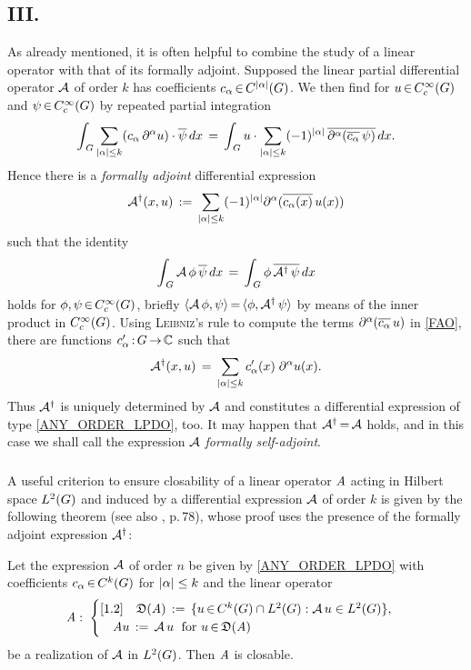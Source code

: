 \documentclass[11pt,twoside]{article}
\def\G{G}
\begin{document}
\subsection*{III. {\TITLEC}}
As already mentioned,
it is often helpful to combine the study of a linear operator
with that of its formally adjoint.
Supposed the linear partial differential operator ${\mathcal{A}}$ of order $k$
has coefficients $c_{\alpha} \xeof C^{\abs{\alpha} }(\G)$.
We then find for $u \xeof \TF$ and $\psi \xeof \TF$
by repeated partial integration
\[
\int_{\,\G} \sum_{\abs{\alpha} \leq k}
(c_{\alpha} \, \PA u) \cdot \overline{\psi} \, dx
\=
\int_{\,\G} u \cdot \sum_{\abs{\alpha} \leq k}
(-1)^{\abs{\alpha} } \, \overline{\PA(\overline{c_{\alpha}} \, \psi)} \, dx.
\]
Hence there is a \textit{formally adjoint} differential expression
\begin{equation}\label{FAO}
\A^{\dag}(x,u) \eqdef
\sum_{\abs{\alpha} \leq k} (-1)^{\abs{\alpha} }
\PA(\overline{c_{\alpha}(x)} \, u(x))
\end{equation}
such that the identity
\[
\int_{\,\G} \A \, \phi \, \overline{\psi} \, dx 
\=
\int_{\,\G} \phi \, \overline{\A^{\dag} \, \psi} \, dx 
\]
holds for $\phi,\psi \xeof \TF$,
briefly
$
\langle {\mathcal{A}}\,\phi,\psi \rangle {\,=\,} \langle \phi,{\mathcal{A}}^{\dag}\,\psi \rangle
$
by means of the inner product in $\TF$.
Using \textsc{Leibniz}'s rule to compute the terms
$\partial^{\alpha}(\overline{c_{\alpha}} \, u)$ in \eqref{FAO},
there are functions $c_{\alpha}'\: \G \xto \C$
such that
\[
\A^{\dag}(x,u) \=
\sum_{\abs{\alpha} \leq k} c_{\alpha}'(x) \; \PA u(x).
\]
Thus ${\mathcal{A}}^{\dag}$ is uniquely determined by ${\mathcal{A}}$
and constitutes a differential expression of type \eqref{ANY_ORDER_LPDO},
too.
It may happen that ${\mathcal{A}}^{\dag} {\,=\,} {\mathcal{A}}$ holds,
and in this case
we shall call the expression ${\mathcal{A}}$ \textit{formally self-adjoint}.

\subparagraph{} %
A useful criterion to ensure closability of a linear operator $\mathit{A}$
acting in Hilbert space $\Lh$
and induced by a differential expression ${\mathcal{A}}$ of order $k$
is given by the following theorem
(see also \cite{Yo}, p.\,78),
whose proof uses the presence of the formally adjoint expression ${\mathcal{A}}^{\dag}$:

\begin{theorem1}\label{L2_CLOSABILITY_THEOREM}
Let the expression ${\mathcal{A}}$ of order $n$ be given by \eqref{ANY_ORDER_LPDO}
with coefficients $c_{\alpha} \xeof C^k(\G)$ for $\abs{\alpha} \leq k$ and
the linear operator
\[
\linA: \;
\begin{cases}[1.2]
\quad \domain{\linA} \eqdef \{u \xeof C^k(\G) \cap \Lh:\A \, u \in \Lh \},\\
\quad \linA u \eqdef \A\,u \; \for u \xeof \domain{\linA}\\
\end{cases}
\]
be a realization of ${\mathcal{A}}$ in $\Lh$.
Then $\mathit{A}$ is closable.
\end{theorem1}
\end{document}
